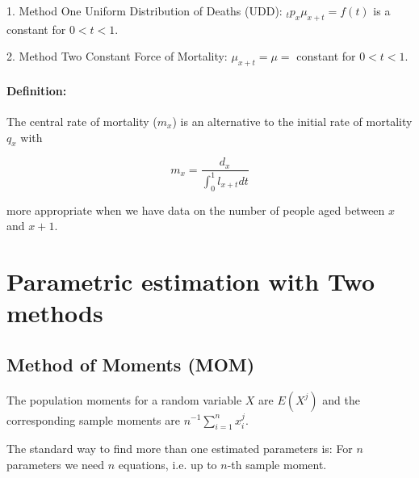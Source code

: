 \documentclass[a4paper, 11pt, twoside]{article}
\begin{document}
1. Method One Uniform Distribution of Deaths (UDD): ${}_tp_x\mu_{x+t}=f(t)$ is a constant for $0<t<1$.

2. Method Two Constant Force of Mortality: $\mu_{x+t}=\mu=$ constant for $0<t<1$.

\paragraph{Definition:} The central rate of mortality ($m_x$) is an alternative to the initial rate of mortality $q_x$ with

\[m_x=\frac{d_x}{\int^1_0l_{x+t}dt}\]

more appropriate when we have data on the number of people aged between $x$ and $x+1$.

\section{Parametric estimation with Two methods}

\subsection{Method of Moments (MOM)}

The population moments for a random variable $X$ are $E(X^j)$ and the corresponding sample moments are $n^{-1}\sum^n_{i=1}x_i^j$.

The standard way to find more than one estimated parameters is: For $n$ parameters we need $n$ equations, i.e. up to $n$-th sample moment.
\end{document}
